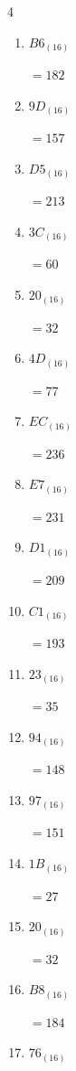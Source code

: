 \begin{multicols}{4}
\begin{enumerate}
  \item $B6_{(16)}$

        $=182$

  \item $9D_{(16)}$

        $=157$

  \item $D5_{(16)}$

        $=213$

  \item $3C_{(16)}$

        $=60$

  \item $20_{(16)}$

        $=32$

  \item $4D_{(16)}$

        $=77$

  \item $EC_{(16)}$

        $=236$

  \item $E7_{(16)}$

        $=231$

  \item $D1_{(16)}$

        $=209$

  \item $C1_{(16)}$

        $=193$

  \item $23_{(16)}$

        $=35$

\columnbreak %

  \item $94_{(16)}$

        $=148$

  \item $97_{(16)}$

        $=151$

  \item $1B_{(16)}$

        $=27$

  \item $20_{(16)}$

        $=32$

  \item $B8_{(16)}$

        $=184$

  \item $76_{(16)}$


\end{enumerate}
\end{multicols}

